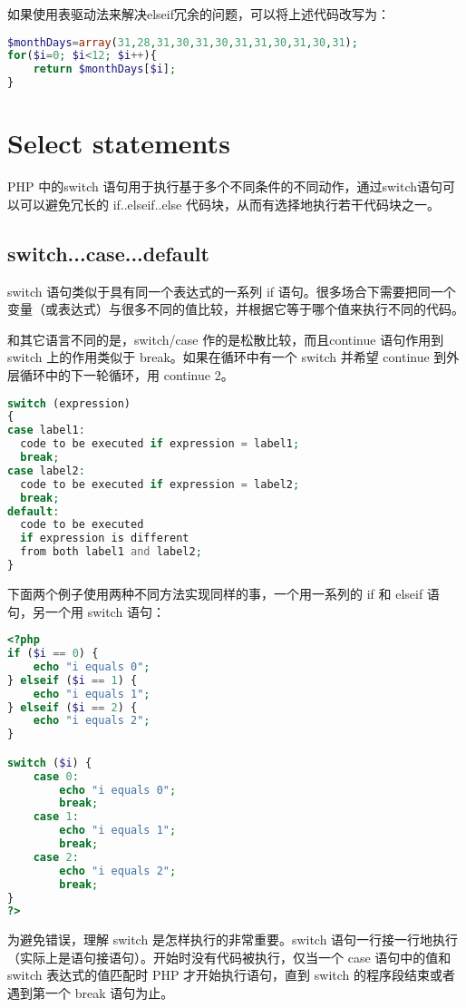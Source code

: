 如果使用表驱动法来解决elseif冗余的问题，可以将上述代码改写为：


\begin{lstlisting}[language=PHP]
$monthDays=array(31,28,31,30,31,30,31,31,30,31,30,31);
for($i=0; $i<12; $i++){
	return $monthDays[$i];
}
\end{lstlisting}

\section{Select statements}

PHP 中的switch 语句用于执行基于多个不同条件的不同动作，通过switch语句可以可以避免冗长的 if..elseif..else 代码块，从而有选择地执行若干代码块之一。


\subsection{switch...case...default}

switch 语句类似于具有同一个表达式的一系列 if 语句。很多场合下需要把同一个变量（或表达式）与很多不同的值比较，并根据它等于哪个值来执行不同的代码。

和其它语言不同的是，switch/case 作的是松散比较，而且continue 语句作用到 switch 上的作用类似于 break。如果在循环中有一个 switch 并希望 continue 到外层循环中的下一轮循环，用 continue 2。

\begin{lstlisting}[language=PHP]
switch (expression)
{
case label1:
  code to be executed if expression = label1;
  break;  
case label2:
  code to be executed if expression = label2;
  break;
default:
  code to be executed
  if expression is different 
  from both label1 and label2;
}
\end{lstlisting}

下面两个例子使用两种不同方法实现同样的事，一个用一系列的 if 和 elseif 语句，另一个用 switch 语句：

\begin{lstlisting}[language=PHP]
<?php
if ($i == 0) {
    echo "i equals 0";
} elseif ($i == 1) {
    echo "i equals 1";
} elseif ($i == 2) {
    echo "i equals 2";
}

switch ($i) {
    case 0:
        echo "i equals 0";
        break;
    case 1:
        echo "i equals 1";
        break;
    case 2:
        echo "i equals 2";
        break;
}
?>
\end{lstlisting}

为避免错误，理解 switch 是怎样执行的非常重要。switch 语句一行接一行地执行（实际上是语句接语句）。开始时没有代码被执行，仅当一个 case 语句中的值和 switch 表达式的值匹配时 PHP 才开始执行语句，直到 switch 的程序段结束或者遇到第一个 break 语句为止。

